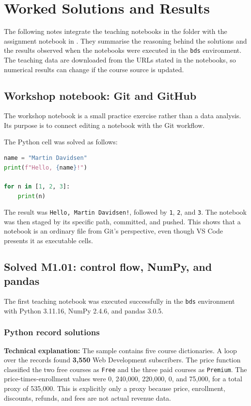 \documentclass[11pt,a4paper]{article}
\begin{document}
\section{Worked Solutions and Results}

The following notes integrate the teaching notebooks in the  folder with the assignment notebook in . They summarise the reasoning behind the solutions and the results observed when the notebooks were executed in the \texttt{bds} environment. The teaching data are downloaded from the URLs stated in the notebooks, so numerical results can change if the course source is updated.

\subsection{Workshop notebook: Git and GitHub}

The workshop notebook is a small practice exercise rather than a data analysis. Its purpose is to connect editing a notebook with the Git workflow.

The Python cell was solved as follows:

\begin{lstlisting}[language=python]
name = "Martin Davidsen"
print(f"Hello, {name}!")

for n in [1, 2, 3]:
    print(n)
\end{lstlisting}

The result was \texttt{Hello, Martin Davidsen!}, followed by \texttt{1}, \texttt{2}, and \texttt{3}. The notebook was then staged by its specific path, committed, and pushed. This shows that a notebook is an ordinary file from Git's perspective, even though VS Code presents it as executable cells.

\subsection{Solved M1.01: control flow, NumPy, and pandas}

The first teaching notebook was executed successfully in the \texttt{bds} environment with Python 3.11.16, NumPy 2.4.6, and pandas 3.0.5.

\subsubsection{Python record solutions}
\textbf{Technical explanation:} The sample contains five course dictionaries. A loop over the records found \textbf{3,550} Web Development subscribers. The price function classified the two free courses as \texttt{Free} and the three paid courses as \texttt{Premium}. The price-times-enrollment values were 0, 240,000, 220,000, 0, and 75,000, for a total proxy of 535,000. This is explicitly only a proxy because price, enrollment, discounts, refunds, and fees are not actual revenue data.
\end{document}
